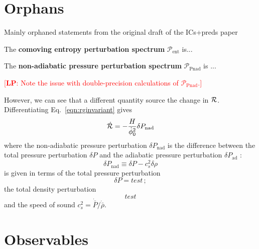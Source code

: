 \documentclass[11pt]{article}
\def\calR{{\cal R}}
\def\df {{\dot \phi_0}}
\def\Pent{{\mathcal P_\mathrm{ent}}}
\def\Ppnad{{\mathcal P_\mathrm{Pnad}}}
\newcommand{\lp}[1]{\textcolor{red}{[{\bf LP}: #1]}}
\begin{document}
\section{Orphans}

Mainly orphaned statements from the original draft of the ICs+preds paper

   The \textbf{comoving entropy perturbation spectrum} $\Pent$ is...

   The \textbf{non-adiabatic pressure perturbation spectrum} $\Ppnad$ is ...

    \lp{ Note the issue with double-precision calculations of $\mathcal P_\mathrm{Pnad}$.}

However, we can see that a different quantity source the change in $\calR$.  Differentiating Eq.~\eqref{eqn:rginvariant} gives
\begin{equation}
  \dot \calR = -\frac{H}{\df^2} \delta P_\mathrm{nad}
  \label{eqn:XXX}
\end{equation}
where the non-adiabatic pressure perturbation $\delta P_\mathrm{nad}$ is the difference between the total pressure perturbation $\delta P$ and the adiabatic pressure perturbation $\delta P_\mathrm{ad}$ :
\begin{equation}
  \delta P_\mathrm{nad} \equiv \delta P - c_s^2 \delta \rho
  \label{eqn:XXX}
\end{equation}
is  given in terms of the total pressure perturbation
\begin{equation}
  \delta P = test \, ;
  \label{eqn:XXX}
\end{equation}
the total density perturbation
\begin{equation}
  test
  \label{eqn:XXX}
\end{equation}
and the speed of sound $c_s^2 = \dot {\bar P} / \dot {\bar \rho}$.

\section{Observables}
\end{document}
